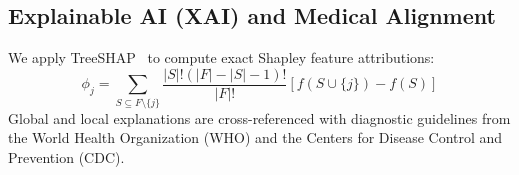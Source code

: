 \subsection{Explainable AI (XAI) and Medical Alignment}
We apply TreeSHAP~\cite{lundberg2017unified} to compute exact Shapley feature attributions:
\begin{equation}
    \phi_j = \sum_{S \subseteq F \setminus \{j\}} \frac{|S|!(|F| - |S| - 1)!}{|F|!} [f(S \cup \{j\}) - f(S)]
\end{equation}
Global and local explanations are cross-referenced with diagnostic guidelines from the World Health Organization (WHO) and the Centers for Disease Control and Prevention (CDC).
